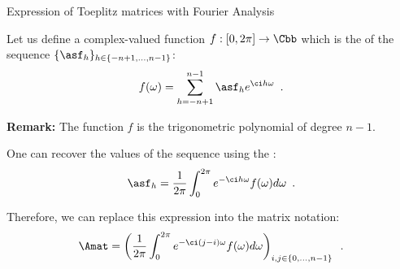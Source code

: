 \begin{frame}{Expression of Toeplitz matrices with Fourier Analysis}

  Let us define a complex-valued function $f:[0, 2\pi] \rightarrow \Cbb$ which is the  of the sequence $\{\asf_h\}_{h \in \{-n+1, \dots, n-1\}}$:
  \begin{equation}
    f(\omega) = \sum_{h = -n+1}^{n-1} \asf_h e^{\ci h \omega} \enspace.
  \end{equation}

  \vspace{-0.2cm}
  \pause
  \noindent
  \textbf{Remark:} The function $f$ is the trigonometric polynomial of degree $n-1$. 

  \vspace{0.2cm}
  \pause
  One can recover the values of the sequence using the :
  \begin{equation}
    \asf_h = \frac{1}{2\pi} \int_0^{2\pi} e^{-\ci h \omega} f(\omega) d\omega \enspace.
  \end{equation}

  \pause
  Therefore, we can replace this expression into the matrix notation: 
  \begin{equation}
    \Amat = \left( \frac{1}{2\pi} \int_0^{2\pi} e^{-\ci (j-i) \omega} f(\omega) d\omega \right)_{i, j \in \{0, \dots, n-1\}} \enspace.
  \end{equation}

\end{frame}



